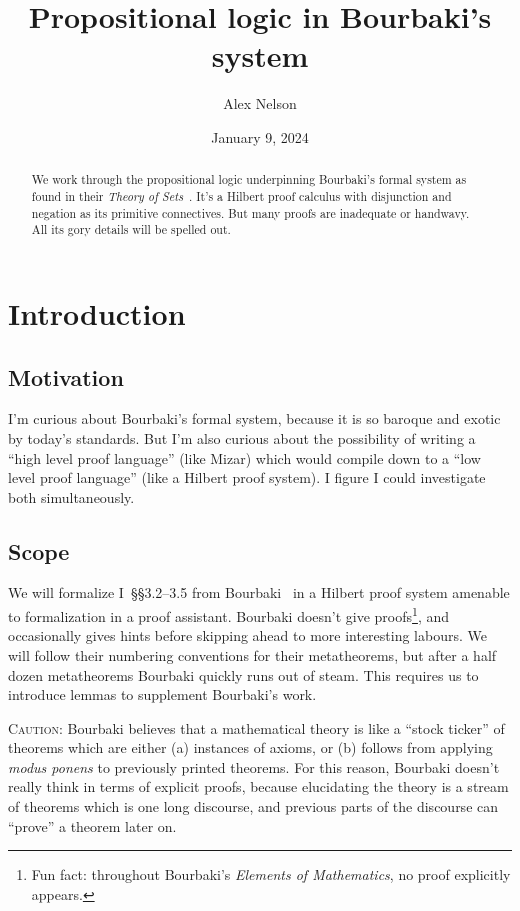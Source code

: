 \documentclass{amsart}%
\title{Propositional logic in Bourbaki's system}
\author{Alex Nelson}
\date{January 9, 2024}
\begin{document}
\maketitle

\begin{abstract}
We work through the propositional logic underpinning Bourbaki's formal
system as found in their \textit{Theory of Sets}~\cite{bourbaki1970sets}.
It's a Hilbert proof calculus with disjunction and negation as its
primitive connectives. But many proofs are inadequate or handwavy. All
its gory details will be spelled out.
\end{abstract}

\tableofcontents\vfill\eject

\section{Introduction}

\subsection{Motivation}
I'm curious about Bourbaki's formal system, because it is so baroque and
exotic by today's standards. But I'm also curious about the possibility
of writing a ``high level proof language'' (like Mizar) which would
compile down to a ``low level proof language'' (like a Hilbert proof system).
I figure I could investigate both simultaneously.

\subsection{Scope}
We will formalize I~\S\S3.2--3.5 from Bourbaki~\cite{bourbaki1970sets}
in a Hilbert proof system amenable to formalization in a proof assistant.
Bourbaki doesn't give proofs\footnote{Fun fact: throughout Bourbaki's
\textit{Elements of Mathematics}, no proof explicitly appears.}, and
occasionally gives hints before skipping ahead to more interesting labours.
We will follow their numbering conventions for their metatheorems, but
after a half dozen metatheorems Bourbaki quickly runs out of steam. This
requires us to introduce lemmas to supplement Bourbaki's work.

\textsc{Caution:} Bourbaki believes that a mathematical theory is like a
``stock ticker'' of theorems which are either (a) instances of axioms,
or (b) follows from applying \textit{modus ponens} to previously printed
theorems. For this reason, Bourbaki doesn't really think in terms of
explicit proofs, because elucidating the theory is a stream of theorems
which is one long discourse, and previous parts of the discourse can
``prove'' a theorem later on.
\end{document}
